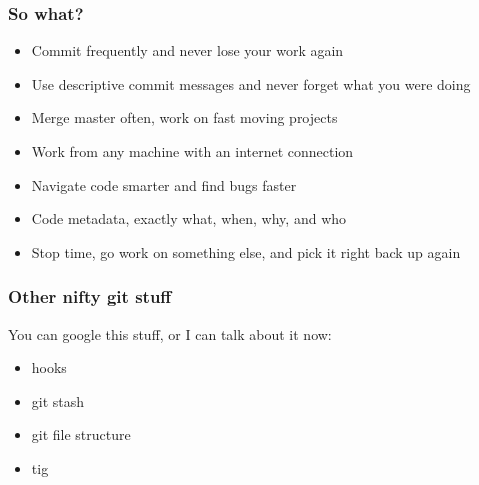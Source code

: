 \documentclass{beamer}
\begin{document}
\begin{frame}[fragile]

\frametitle{So what?}

\begin{itemize}
  \item{Commit frequently and never lose your work again}
  \item{Use descriptive commit messages and never forget what you were doing}
  \item{Merge master often, work on fast moving projects}
  \item{Work from any machine with an internet connection}
  \item{Navigate code smarter and find bugs faster}
  \item{Code metadata, exactly what, when, why, and who}
  \item{Stop time, go work on something else, and pick it right back up again}
\end{itemize}
    
\end{frame}

\begin{frame}[fragile]

\frametitle{Other nifty git stuff}

You can google this stuff, or I can talk about it now:

\begin{itemize}
  \item{hooks}
  \item{git stash}
  \item{git file structure}
  \item{tig}
\end{itemize}
    
\end{frame}
\end{document}

